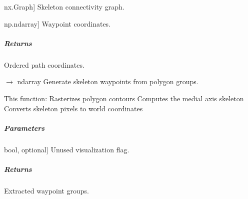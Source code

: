 \documentclass[letterpaper,10pt,english]{sphinxmanual}
\begin{document}
\begin{fulllineitems}
\begin{fulllineitems}
\begin{description}
\sphinxlineitem{graph}{[}nx.Graph{]}
\sphinxAtStartPar
Skeleton connectivity graph.

\sphinxlineitem{waypoints}{[}np.ndarray{]}
\sphinxAtStartPar
Waypoint coordinates.

\end{description}


\subparagraph{Returns}
\label{\detokenize{mirte_lc_nav2.navigators:id15}}\begin{description}
\sphinxAtStartPar
Ordered path coordinates.

\end{description}

\end{fulllineitems}


\begin{fulllineitems}
\label{\detokenize{mirte_lc_nav2.navigators:mirte_lc_nav2.navigators.SkeletonPath.read}}
\pysigstartsignatures
\pysiglinewithargsret
{}
{}
{{ $\rightarrow$ ndarray}}
\pysigstopsignatures
\sphinxAtStartPar
Generate skeleton waypoints from polygon groups.

\sphinxAtStartPar
This function:
\sphinxhyphen{} Rasterizes polygon contours
\sphinxhyphen{} Computes the medial axis skeleton
\sphinxhyphen{} Converts skeleton pixels to world coordinates


\subparagraph{Parameters}
\label{\detokenize{mirte_lc_nav2.navigators:id16}}\begin{description}
\sphinxlineitem{plot}{[}bool, optional{]}
\sphinxAtStartPar
Unused visualization flag.

\end{description}


\subparagraph{Returns}
\label{\detokenize{mirte_lc_nav2.navigators:id17}}\begin{description}
\sphinxAtStartPar
Extracted waypoint groups.

\end{description}

\end{fulllineitems}


\end{fulllineitems}

\end{document}
